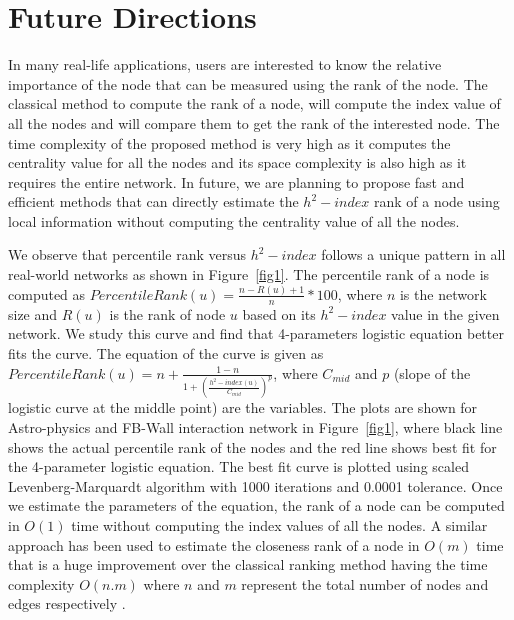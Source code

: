 \documentclass[conference]{IEEEtran}
\begin{document}
\section{Future Directions}

%

In many real-life applications, users are interested to know the relative importance of the node that can be measured using the rank of the node. The classical method to compute the rank of a node, will compute the index value of all the nodes and will compare them to get the rank of the interested node. The time complexity of the proposed method is very high as it computes the centrality value for all the nodes and its space complexity is also high as it requires the entire network. In future, we are planning to propose fast and efficient methods that can directly estimate the $h^2-index$ rank of a node using local information without computing the centrality value of all the nodes. 

We observe that percentile rank versus $h^2-index$ follows a unique pattern in all real-world networks as shown in Figure~\ref{fig1}. The percentile rank of a node is computed as $PercentileRank(u)=\frac{n-R(u)+1}{n}*100$, where $n$ is the network size and $R(u)$ is the rank of node $u$ based on its $h^2-index$ value in the given network. We study this curve and find that 4-parameters logistic equation better fits the curve. The equation of the curve is given as $PercentileRank(u) = n + \frac{1-n}{1+\left( \frac{h^2-index(u)}{C_{mid}}\right) ^p}$, where $C_{mid}$ and $p$ (slope of the logistic curve at the middle point) are the variables. The plots are shown for Astro-physics and FB-Wall interaction network in Figure~\ref{fig1}, where black line shows the actual percentile rank of the nodes and the red line shows best fit for the 4-parameter logistic equation. The best fit curve is plotted using scaled Levenberg-Marquardt algorithm \cite{more1978levenberg} with 1000 iterations and 0.0001 tolerance. Once we estimate the parameters of the equation, the rank of a node can be computed in $O(1)$ time without computing the index values of all the nodes. A similar approach has been used to estimate the closeness rank of a node in $O(m)$ time that is a huge improvement over the classical ranking method having the time complexity $O(n.m)$ where $n$ and $m$ represent the total number of nodes and edges respectively \cite{saxena2017afaster}.
\end{document}
